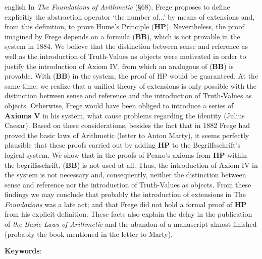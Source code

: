 \begin{resumo} 
    \begin{otherlanguage*}{english}
    In \textit{The Foundations of Arithmetic} (§68), Frege proposes to define explicitly the abstraction operator `the number of...' by means of extensions and, from this definition, to prove Hume's Principle (\textbf{HP}). Nevertheless, the proof imagined by Frege depends on a formula (\textbf{BB}), which is not provable in the system in 1884. We believe that the distinction between sense and reference as well as the introduction of Truth-Values as objects were motivated in order to justify the introduction of Axiom IV, from which an analogous of (\textbf{BB}) is provable. With (\textbf{BB}) in the system, the proof of HP would be guaranteed. At the same time, we realize that a unified theory of extensions is only possible with the distinction between sense and reference and the introduction of Truth-Values as objects. Otherwise, Frege would have been obliged to introduce a series of \textbf{Axioms V} in his system, what cause problems regarding the identity (Julius Caesar). Based on these considerations, besides the fact that in 1882 Frege had proved the basic laws of Arithmetic (letter to Anton Marty), it seems perfectly plausible that these proofs carried out by adding \textbf{HP} to the Begriffsschrift's logical system. We show that in the proofs of Peano's axioms from \textbf{HP} within the begriffsschrift, (\textbf{BB}) is not used at all. Thus, the introduction of Axiom IV in the system is not necessary and, consequently, neither the distinction between sense and reference nor the introduction of Truth-Values as objects. From these findings we may conclude that probably the introduction of extensions in The \textit{Foundations} was a late act; and that Frege did not hold a formal proof of \textbf{HP} from his explicit definition. These facts also explain the delay in the publication of \textit{the Basic Laws of Arithmetic} and the abandon of a manuscript almost finished (probably the book mentioned in the letter to Marty).
    \vspace{\onelineskip} 
    
    \noindent \textbf{Keywords}: \palavraschavesIngles 
    
    \end{otherlanguage*} 
    \end{resumo} 